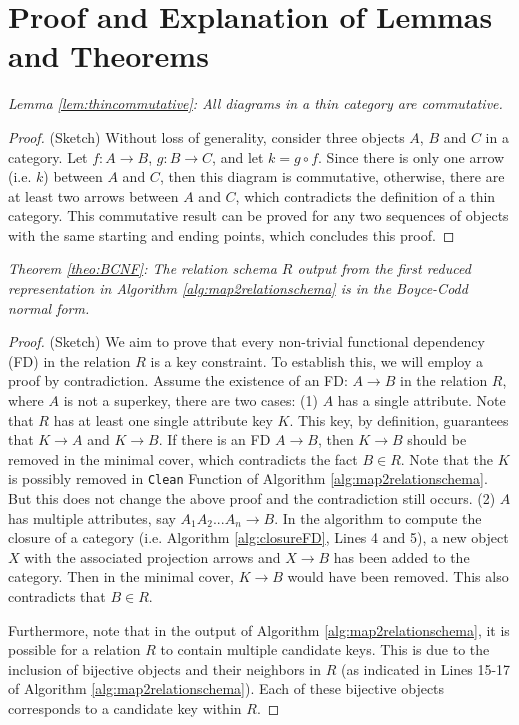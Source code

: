 \section{Proof and Explanation of Lemmas and Theorems}
\label{sec:proofs}

\noindent \textit{Lemma \ref{lem:thincommutative}:  All diagrams in a thin category are commutative. }

\begin{proof} (Sketch) Without loss of generality, consider three objects $A$, $B$ and $C$ in a category.  Let $f: A \to B$,  $g: B \to C$, and   let $k = g \circ f$. Since there is only one arrow (i.e. $k$) between $A$ and $C$, then this diagram is commutative, otherwise, there are at least two arrows between $A$ and $C$, which contradicts the definition of a thin category. This commutative result can be proved for any two sequences of objects with the same starting and ending points, which concludes this proof.
\end{proof}




\noindent \textit{Theorem \ref{theo:BCNF}:  The relation schema $R$ output from the first reduced representation in Algorithm  \ref{alg:map2relationschema} is in the Boyce-Codd normal form.}

\begin{proof} 
(Sketch) We aim to prove that every non-trivial functional dependency (FD) in the relation $R$ is a key constraint. To establish this, we will employ a proof by contradiction. Assume the existence of an FD: $A \to B$ in the relation $R$, where $A$ is not a superkey, there are two cases:
(1)  $A$ has a single attribute.  Note that $R$ has at least one single attribute key $K$. This key, by definition, guarantees that $K \to A$ and $K \to B$. If there is an FD $A \to B$, then $K \to B$ should be removed in the minimal cover, which contradicts the fact $B \in R$. Note that the $K$ is possibly removed in \texttt{Clean} Function of Algorithm \ref{alg:map2relationschema}. But this does not change the above proof and the contradiction still occurs. (2) $A$ has multiple attributes, say $A_1 A_2... A_n \to B$. In the algorithm to compute the closure of a category (i.e. Algorithm \ref{alg:closureFD}, Lines 4 and 5), a new object $X$ with the associated projection arrows and  $X \to B$ has been added to the category. Then in the minimal cover, $K \to B$ would have been removed. This also contradicts that $B \in R$.

Furthermore,  note that in the output of Algorithm \ref{alg:map2relationschema}, it is possible for a relation $R$ to contain multiple candidate keys. This is due to the inclusion of bijective objects and their neighbors in $R$ (as indicated in Lines 15-17 of Algorithm \ref{alg:map2relationschema}). Each of these bijective objects corresponds to a candidate key within $R$.
\end{proof}

